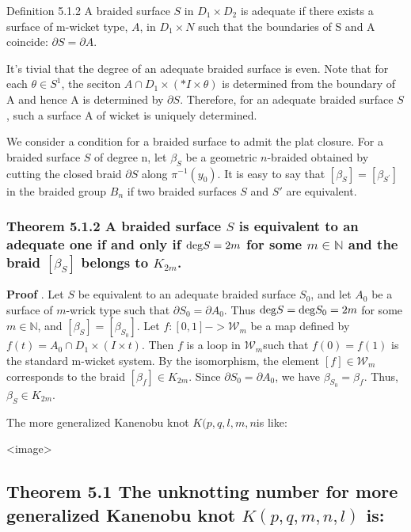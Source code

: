 \documentclass[lang=cn]{elegantpaper}
\begin{document}
Definition 5.1.2 A braided surface \(S\) in \(D_{1} \times D_{2}\) is adequate if there exists a surface of m-wicket type, \(A\), in \(D_{1} \times N\) such that the boundaries of S and A coincide: \(\partial S = \partial A\).

It's tivial that the degree of an adequate braided surface is even. Note that for each \(\theta \in S^{1}\), the seciton \(A \cap  D_{1} \times (*I \times {\theta})\)  is determined from the boundary of A and hence A is determined by \(\partial S\). Therefore, for an adequate braided surface \(S\), such a surface A of wicket is uniquely determined.

We consider a condition for a braided surface to admit the plat closure. For a
braided surface \(S\) of degree n, let \(\beta_{S}\) be a geometric \(n\)-braided obtained by cutting the closed braid \(\partial S\) along \(\pi ^{-1}(y_{0})\). It is easy to say that \([\beta_{S}] = [\beta_{S^{'}}]\) in the braided group \(B_{n}\) if two braided surfaces \(S\) and \(S'\) are equivalent.
\subsubsection{Theorem 5.1.2 A braided surface \(S\) is equivalent to an adequate one if and only if \({\rm deg} S = 2m\) for some \(m \in \mathbb{N}\) and the braid \([\beta_{S}]\) belongs to \(K_{2m}\).}
\label{sec:org3ef03e2}
\textbf{Proof} . Let \(S\) be equivalent to an adequate braided surface \(S_{0}\), and let \(A_{0}\) be a surface of \(m\)-wrick type such that \(\partial S_{0} = \partial A_{0}\). Thus \({\rm deg} S = {\rm deg } S_{0} = 2m\) for some \(m \in \mathbb{N}\), and \([\beta_{S}]=[\beta_{S_{0}}]\). Let \(f:[0,1] -> \mathscr{W}_{m}\) be a map defined by \(f(t) = A_{0} \cap D_{1} \times (I \times {t})\). Then \(f\) is a loop in \(\mathscr{W}_{m}\)such that \(f(0) = f(1)\) is the standard m-wicket system. By the isomorphism, the element \([f] \in \mathscr{W}_{m}\) corresponds to the braid \([\beta_{f}] \in K_{2m}\). Since \(\partial S_{0} = \partial A_{0}\), we have \(\beta_{S_{0}} = \beta_{f}\). Thus, \(\beta_{S} \in K_{2m}\).

The more generalized Kanenobu knot \(K(p, q, l, m, n\)is like:

<image>

\subsection{Theorem 5.1 The unknotting number for more generalized Kanenobu knot \(K(p, q, m, n, l)\) is:}
\label{sec:org8798504}
\end{document}
